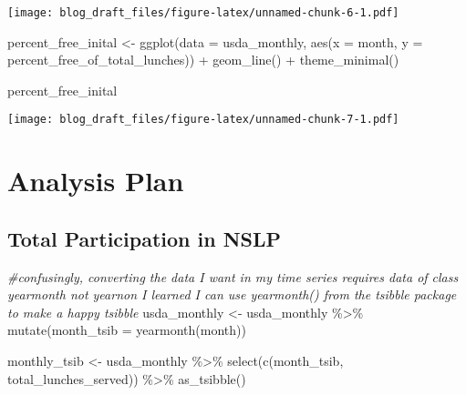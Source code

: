\documentclass[
]{article}
\newenvironment{Shaded}{\begin{snugshade}}{\end{snugshade}}
\newcommand{\AttributeTok}[1]{\textcolor[rgb]{0.77,0.63,0.00}{#1}}
\newcommand{\CommentTok}[1]{\textcolor[rgb]{0.56,0.35,0.01}{\textit{#1}}}
\newcommand{\FunctionTok}[1]{\textcolor[rgb]{0.00,0.00,0.00}{#1}}
\newcommand{\NormalTok}[1]{#1}
\newcommand{\OtherTok}[1]{\textcolor[rgb]{0.56,0.35,0.01}{#1}}
\newcommand{\SpecialCharTok}[1]{\textcolor[rgb]{0.00,0.00,0.00}{#1}}
\begin{document}
\texttt{[image: blog\_draft\_files/figure-latex/unnamed-chunk-6-1.pdf]}

\begin{Shaded}
\begin{Highlighting}[]
\NormalTok{percent\_free\_inital }\OtherTok{\textless{}{-}} \FunctionTok{ggplot}\NormalTok{(}\AttributeTok{data =}\NormalTok{ usda\_monthly, }\FunctionTok{aes}\NormalTok{(}\AttributeTok{x =}\NormalTok{ month, }\AttributeTok{y =}\NormalTok{ percent\_free\_of\_total\_lunches)) }\SpecialCharTok{+}
  \FunctionTok{geom\_line}\NormalTok{() }\SpecialCharTok{+}
  \FunctionTok{theme\_minimal}\NormalTok{()}

\NormalTok{percent\_free\_inital}
\end{Highlighting}
\end{Shaded}

\texttt{[image: blog\_draft\_files/figure-latex/unnamed-chunk-7-1.pdf]}

\hypertarget{analysis-plan}{%
\section{Analysis Plan}\label{analysis-plan}}

\hypertarget{total-participation-in-nslp}{%
\subsection{Total Participation in
NSLP}\label{total-participation-in-nslp}}

\begin{Shaded}
\begin{Highlighting}[]
\CommentTok{\#confusingly, converting the data I want in my time series requires data of class \textasciigrave{}yearmonth\textasciigrave{} not \textasciigrave{}yearnon\textasciigrave{} I learned I can use \textasciigrave{}yearmonth()\textasciigrave{} from the tsibble package to make a happy tsibble}
\NormalTok{usda\_monthly }\OtherTok{\textless{}{-}}\NormalTok{ usda\_monthly }\SpecialCharTok{\%\textgreater{}\%} 
  \FunctionTok{mutate}\NormalTok{(}\AttributeTok{month\_tsib =} \FunctionTok{yearmonth}\NormalTok{(month))}

\NormalTok{monthly\_tsib }\OtherTok{\textless{}{-}}\NormalTok{ usda\_monthly }\SpecialCharTok{\%\textgreater{}\%}
  \FunctionTok{select}\NormalTok{(}\FunctionTok{c}\NormalTok{(month\_tsib, total\_lunches\_served)) }\SpecialCharTok{\%\textgreater{}\%} 
  \FunctionTok{as\_tsibble}\NormalTok{()}
\end{Highlighting}
\end{Shaded}
\end{document}
